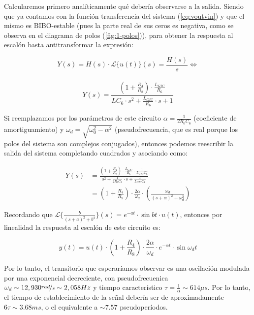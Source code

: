 \documentclass[../../tc_tp3_main.tex]{subfiles}
\begin{document}
Calcularemos primero anal\'iticamente qu\'e deber\'ia observarse a la salida. Siendo que ya contamos con la funci\'on transferencia del sistema (\ref{eq:voutvin}) y que el mismo es BIBO-estable (pues la parte real de sus ceros es negativa, como se observa en el diagrama de polos (\ref{fig:1-polos})), para obtener la respuesta al escal\'on basta antitransformar la expresi\'on:

\[	Y(s) = H(s) \cdot \mathcal{L}\{u(t)\}(s) = \frac{H(s)}{s} \Leftrightarrow\]\\
\[	Y(s) =  \frac{\left( 1+\frac{R_4}{R_8} \right) \cdot \frac{L_{GIC}}{R_6}}{ LC_6 \cdot s^2  + \frac{L_{GIC}}{R_6} \cdot s + 1} \]

Si reemplazamos por los par\'ametros de este circuito $\alpha = \frac{1}{2R_6 C_6}$ (coeficiente de amortiguamiento) y $\omega_d = \sqrt{\omega_0^2 - \alpha^2}$ (pseudofrecuencia, que es real porque los polos del sistema son complejos conjugados), entonces podemos reescribir la salida del sistema completando cuadrados y asociando como:\par

\[
	\begin{aligned} 
	Y(s) &= \frac{ \left( 1+\frac{R_4}{R_8} \right) \cdot \frac{L_{GIC}}{R_6} \cdot \frac{1}{L_{GIC}C_6} }{s^2  + \frac{1}{2R_6 C_6} \cdot s + \frac{1}{L_{GIC}C_6}} \\
	 &= \left( 1+\frac{R_4}{R_8} \right) \cdot \frac{2\alpha}{\omega_d} \cdot \left( \frac{\omega_d}{(s+\alpha)^2 + \omega_d^2} \right)
	 \end{aligned}
\]

Recordando que $\mathcal{L}\{ \frac{b}{(s+a)^2+b^2} \}(s) = e^{-at}\cdot \sin{bt} \cdot u(t)$, entonces por linealidad la respuesta al escal\'on de este circuito es:

\begin{equation}
	y(t) = u(t) \cdot \left(1+\frac{R_4}{R_8} \right) \cdot \frac{2\alpha}{\omega_d} \cdot e^{-\alpha t}\cdot \sin{\omega_d t}
\end{equation} 

Por lo tanto, el transitorio que esperar\'iamos observar es una oscilaci\'on modulada por una exponencial decreciente, con pseudofrecuenica $\omega_d \sim 12,930 \nicefrac{rad}{s} \sim 2,058Hz$ y tiempo caracter\'istico $\tau = \frac{1}{\alpha} \sim 614\mu s$. Por lo tanto, el tiempo de establecimiento de la se\~nal deber\'ia ser de aproximadamente $6\tau \sim 3.68ms$, o el equivalente a $\sim 7.57$ pseudoper\'iodos.
\end{document}
